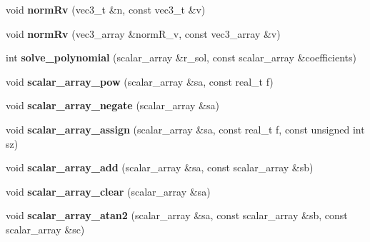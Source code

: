 \begin{DoxyCompactItemize}
\item 
void {\bfseries norm\+Rv} (vec3\+\_\+t \&n, const vec3\+\_\+t \&v)\hypertarget{namespacekukadu_a27b18ef94f1f1a70faa1d54aa987f735}{}\label{namespacekukadu_a27b18ef94f1f1a70faa1d54aa987f735}

\item 
void {\bfseries norm\+Rv} (vec3\+\_\+array \&norm\+R\+\_\+v, const vec3\+\_\+array \&v)\hypertarget{namespacekukadu_a0b98b97029ccc73c369965541804190c}{}\label{namespacekukadu_a0b98b97029ccc73c369965541804190c}

\item 
int {\bfseries solve\+\_\+polynomial} (scalar\+\_\+array \&r\+\_\+sol, const scalar\+\_\+array \&coefficients)\hypertarget{namespacekukadu_ab1552f43605763b932e61be359c9b565}{}\label{namespacekukadu_ab1552f43605763b932e61be359c9b565}

\item 
void {\bfseries scalar\+\_\+array\+\_\+pow} (scalar\+\_\+array \&sa, const real\+\_\+t f)\hypertarget{namespacekukadu_af2a0e97b06586f20d61f3ebe7b3a7bc7}{}\label{namespacekukadu_af2a0e97b06586f20d61f3ebe7b3a7bc7}

\item 
void {\bfseries scalar\+\_\+array\+\_\+negate} (scalar\+\_\+array \&sa)\hypertarget{namespacekukadu_a84e73886b6c80b4838088ad51481f135}{}\label{namespacekukadu_a84e73886b6c80b4838088ad51481f135}

\item 
void {\bfseries scalar\+\_\+array\+\_\+assign} (scalar\+\_\+array \&sa, const real\+\_\+t f, const unsigned int sz)\hypertarget{namespacekukadu_a36aa83ed7b92775c3e7937f7d69854f3}{}\label{namespacekukadu_a36aa83ed7b92775c3e7937f7d69854f3}

\item 
void {\bfseries scalar\+\_\+array\+\_\+add} (scalar\+\_\+array \&sa, const scalar\+\_\+array \&sb)\hypertarget{namespacekukadu_a9aa78b843be638c7ee98b6085e77a926}{}\label{namespacekukadu_a9aa78b843be638c7ee98b6085e77a926}

\item 
void {\bfseries scalar\+\_\+array\+\_\+clear} (scalar\+\_\+array \&sa)\hypertarget{namespacekukadu_a6c72c781f58dcbbc1e6461bd56efe09f}{}\label{namespacekukadu_a6c72c781f58dcbbc1e6461bd56efe09f}

\item 
void {\bfseries scalar\+\_\+array\+\_\+atan2} (scalar\+\_\+array \&sa, const scalar\+\_\+array \&sb, const scalar\+\_\+array \&sc)\hypertarget{namespacekukadu_a32977b92c28d1428c23258864b2181f1}{}\label{namespacekukadu_a32977b92c28d1428c23258864b2181f1}


\end{DoxyCompactItemize}

